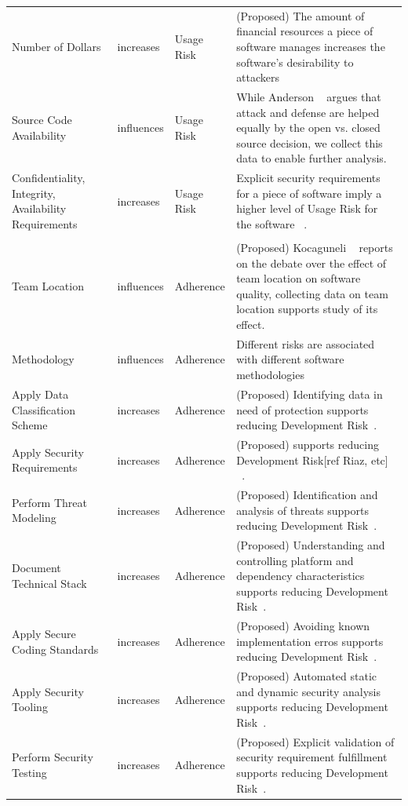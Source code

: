 \begin{table}[!htbp]
\begin{scriptsize}
\begin{tabular}{p{1.75cm}p{1cm}p{1cm}p{6cm}}
			Number of Dollars &	increases &	Usage Risk & (Proposed) The amount of financial resources a piece of software manages increases the software's desirability to attackers\\
			Source Code Availability	& influences &	Usage Risk & While Anderson ~\cite{anderson2002security} argues that attack and defense
			are helped equally by the open vs. closed source decision, we collect this data to enable further analysis.  \\
			Confidentiality, Integrity, Availability Requirements &	increases &	Usage Risk	& Explicit security requirements for a piece of software imply a higher level of Usage Risk for the software ~\cite{mell2007complete}. \\
			\hline \\[-1.8ex]
			Team Location &	influences &	Adherence	& (Proposed)  Kocaguneli ~\cite{kocaguneli2013distributed} reports on the debate over the effect of team location on software quality, collecting data on team location supports study of its effect. \\
			Methodology	& influences &	Adherence	& Different risks are associated with different software methodologies~\cite{williams2004xpef,jones2000software} \\
			Apply Data Classification Scheme & increases & 	Adherence & (Proposed) Identifying data in need of protection supports reducing Development Risk~\cite{morrison2017surveying}.\\	
			Apply Security Requirements	&	increases	&	Adherence & (Proposed)  supports reducing Development Risk[ref Riaz, etc] ~\cite{morrison2017surveying}.\\
			Perform Threat Modeling &	increases &	Adherence &(Proposed) Identification and analysis of threats supports reducing Development Risk~\cite{morrison2017surveying}. \\	
			Document Technical Stack &	increases &	Adherence & (Proposed) Understanding and controlling platform and dependency characteristics supports reducing Development Risk~\cite{morrison2017surveying}.\\	
			Apply Secure Coding Standards &	increases	& Adherence & (Proposed)  Avoiding known implementation erros supports reducing Development Risk~\cite{morrison2017surveying}.\\
			Apply Security Tooling &	increases &	Adherence & (Proposed)  Automated static and dynamic security analysis supports reducing Development Risk~\cite{morrison2017surveying}.\\
			Perform Security Testing &	increases &	Adherence & (Proposed)  Explicit validation of security requirement fulfillment supports reducing Development Risk~\cite{morrison2017surveying}.\\	

\end{tabular}
\end{scriptsize}
\end{table}
